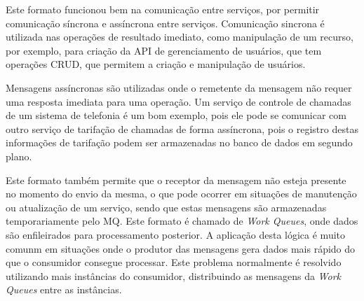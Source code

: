 Este formato funcionou bem na comunicação entre serviços, por permitir comunicação
síncrona e assíncrona entre serviços. Comunicação sincrona é utilizada nas operações
de resultado imediato, como manipulação de um recurso, por exemplo, para criação
da \ac{API} de gerenciamento de usuários, que tem operações \ac{CRUD}, que
permitem a criação e manipulação de usuários.

Mensagens assíncronas são utilizadas onde o remetente da mensagem não requer uma
resposta imediata para uma operação. Um serviço de controle de chamadas de um
sistema de telefonia é um bom exemplo, pois ele pode se comunicar com outro
serviço de tarifação de chamadas de forma assíncrona, pois o registro destas
informações de tarifação podem ser armazenadas no banco de dados em segundo
plano.

Este formato também permite que o receptor da mensagem não esteja
presente no momento do envio da mesma, o que pode ocorrer em situações de
manutenção ou atualização de um serviço, sendo que estas mensagens são
armazenadas temporariamente pelo \ac{MQ}. Este formato é chamado de
\emph{Work Queues}, onde dados são enfileirados para processamento
posterior. A aplicação desta lógica é muito comunm em situações onde o
produtor das mensagens gera dados mais rápido do que o consumidor consegue
processar. Este problema normalmente é resolvido utilizando mais instâncias
do consumidor, distribuindo as mensagens da \emph{Work Queues} entre as
instâncias.

